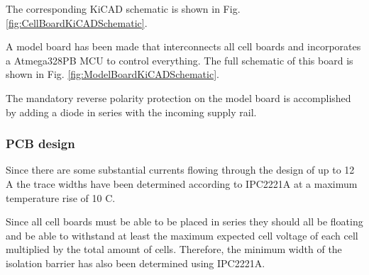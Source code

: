 The corresponding KiCAD schematic is shown in Fig. \ref{fig:CellBoardKiCADSchematic}.

A model board has been made that interconnects all cell boards and incorporates a Atmega328PB MCU to control everything. The full schematic of this board is shown in Fig. \ref{fig:ModelBoardKiCADSchematic}. 

The mandatory reverse polarity protection on the model board is accomplished by adding a diode in series with the incoming supply rail.

\subsubsection{PCB design}
Since there are some substantial currents flowing through the design of up to 12 A the trace widths have been determined according to IPC2221A at a maximum temperature rise of 10 \textdegree C.

Since all cell boards must be able to be placed in series they should all be floating and be able to withstand at least the maximum expected cell voltage of each cell multiplied by the total amount of cells. Therefore, the minimum width of the isolation barrier has also been determined using IPC2221A.


